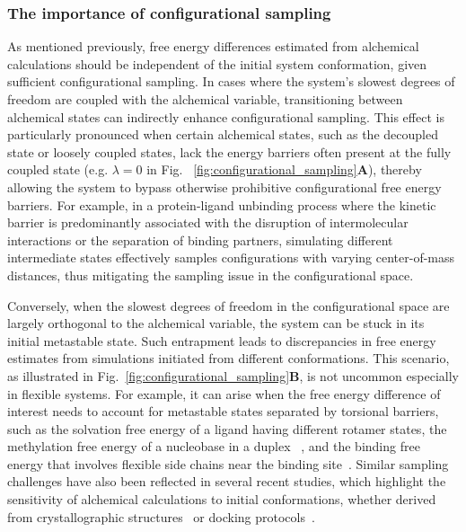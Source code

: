 \documentclass[9pt,bestpractices]{livecoms}
\begin{document}
\subsubsection{The importance of configurational sampling}
\label{sec:configurational_sampling}
As mentioned previously, free energy differences estimated from alchemical calculations should be independent of the initial system conformation, given sufficient configurational sampling. In cases where the system's slowest degrees of freedom are coupled with the alchemical variable, transitioning between alchemical states can indirectly enhance configurational sampling. This effect is particularly pronounced when certain alchemical states, such as the decoupled state or loosely coupled states, lack the energy barriers often present at the fully coupled state (e.g. $\lambda=0$ in Fig. ~\ref{fig:configurational_sampling}\textbf{A}), thereby allowing the system to bypass otherwise prohibitive configurational free energy barriers. For example, in a protein-ligand unbinding process where the kinetic barrier is predominantly associated with the disruption of intermolecular interactions or the separation of binding partners, simulating different intermediate states effectively samples configurations with varying center-of-mass distances, thus mitigating the sampling issue in the configurational space. 

Conversely, when the slowest degrees of freedom in the configurational space are largely orthogonal to the alchemical variable, the system can be stuck in its initial metastable state. Such entrapment leads to discrepancies in free energy estimates from simulations initiated from different conformations. This scenario, as illustrated in Fig.~\ref{fig:configurational_sampling}\textbf{B}, is not uncommon especially in flexible systems. For example, it can arise when the free energy difference of interest needs to account for metastable states separated by torsional barriers, such as the solvation free energy of a ligand having different rotamer states, the methylation free energy of a nucleobase in a duplex ~\cite{hsu2023alchemical}, and the binding free energy that involves flexible side chains near the binding site~\cite{la2022alchemical}. Similar sampling challenges have also been reflected in several recent studies, which highlight the sensitivity of alchemical calculations to initial conformations, whether derived from crystallographic structures~\cite{suruzhon2021sensitivity, baumann2024impact} or docking protocols~\cite{cappel2020impact}. 
\end{document}
